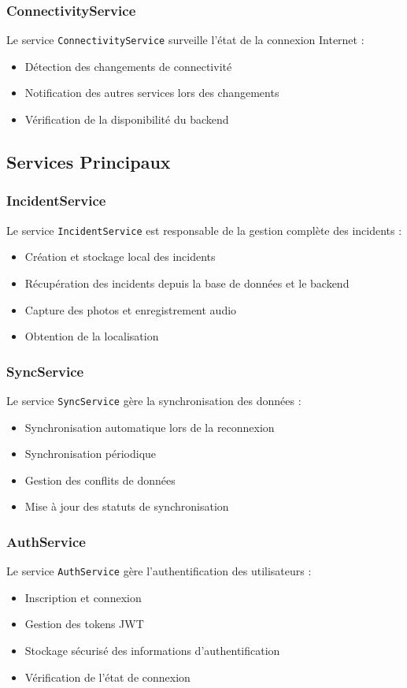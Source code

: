 \documentclass[12pt,a4paper]{article}
\begin{document}
\subsubsection{ConnectivityService}
Le service \texttt{ConnectivityService} surveille l'état de la connexion Internet :
\begin{itemize}
    \item Détection des changements de connectivité
    \item Notification des autres services lors des changements
    \item Vérification de la disponibilité du backend
\end{itemize}

\subsection{Services Principaux}

\subsubsection{IncidentService}
Le service \texttt{IncidentService} est responsable de la gestion complète des incidents :
\begin{itemize}
    \item Création et stockage local des incidents
    \item Récupération des incidents depuis la base de données et le backend
    \item Capture des photos et enregistrement audio
    \item Obtention de la localisation
\end{itemize}

\subsubsection{SyncService}
Le service \texttt{SyncService} gère la synchronisation des données :
\begin{itemize}
    \item Synchronisation automatique lors de la reconnexion
    \item Synchronisation périodique
    \item Gestion des conflits de données
    \item Mise à jour des statuts de synchronisation
\end{itemize}

\subsubsection{AuthService}
Le service \texttt{AuthService} gère l'authentification des utilisateurs :
\begin{itemize}
    \item Inscription et connexion
    \item Gestion des tokens JWT
    \item Stockage sécurisé des informations d'authentification
    \item Vérification de l'état de connexion
\end{itemize}
\end{document}
